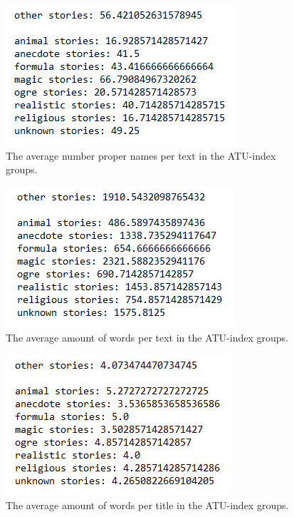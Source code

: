 \begin{figure}
\centering
\includegraphics[]{random/propernames_text_.PNG}
\caption{The average number proper names per text in the ATU-index groups.}
\label{fig:rand4}
\end{figure}

\begin{figure}
\centering
\includegraphics[]{random/wordstext.PNG}
\caption{The average amount of words per text in the ATU-index groups.}
\label{fig:rand5}
\end{figure}

\begin{figure}
\centering
\includegraphics[]{random/wordstitle.PNG}
\caption{The average amount of words per title in the ATU-index groups.}
\label{fig:rand6}
\end{figure}

